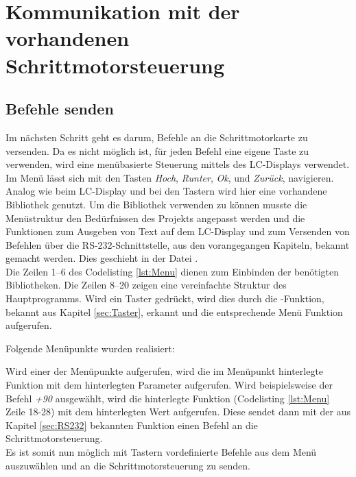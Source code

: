 \section{Kommunikation mit der vorhandenen Schrittmotorsteuerung}
\label{sec:Komm_SM}
\subsection{Befehle senden}
\label{sec:menu}
Im nächsten Schritt geht es darum, Befehle an die Schrittmotorkarte zu versenden. Da es nicht möglich ist, für jeden Befehl eine eigene Taste zu verwenden, 
wird eine menübasierte Steuerung mittels des LC-Displays verwendet. Im Menü lässt sich mit den Tasten \emph{Hoch}, \emph{Runter}, \emph{Ok}, und \emph{Zurück}, navigieren.\\
Analog wie beim LC-Display und bei den Tastern wird hier eine vorhandene Bibliothek genutzt. Um die Bibliothek verwenden zu können musste die Menüstruktur den Bedürfnissen des Projekts angepasst werden und die Funktionen zum Ausgeben von Text auf dem LC-Display und zum Versenden von Befehlen über die RS-232-Schnittstelle, aus den vorangegangen Kapiteln, bekannt gemacht werden. Dies geschieht in der Datei .\\
Die Zeilen 1--6 des Codelisting \ref{lst:Menu} dienen zum Einbinden der benötigten Bibliotheken. Die Zeilen 8--20 zeigen eine vereinfachte Struktur des Hauptprogramms. Wird ein Taster gedrückt, wird dies durch die -Funktion, bekannt aus Kapitel \ref{sec:Taster}, erkannt und die entsprechende Menü Funktion aufgerufen.
\lstset{language=C, basicstyle=\footnotesize, showstringspaces=false, tabsize=8}

Folgende Menüpunkte wurden realisiert:
\lstset{language=C, basicstyle=\footnotesize, showstringspaces=false, tabsize=8}

Wird einer der Menüpunkte aufgerufen, wird die im Menüpunkt hinterlegte Funktion mit dem hinterlegten Parameter aufgerufen. Wird beispielsweise der Befehl \emph{+90} ausgewählt, wird die hinterlegte Funktion (Codelisting \ref{lst:Menu} Zeile 18-28) mit dem hinterlegten Wert aufgerufen. Diese sendet dann mit der aus Kapitel \ref{sec:RS232} bekannten Funktion  einen Befehl an die Schrittmotorsteuerung.\\
Es ist somit nun möglich mit Tastern vordefinierte Befehle aus dem Menü auszuwählen und an die Schrittmotorsteuerung zu senden.
